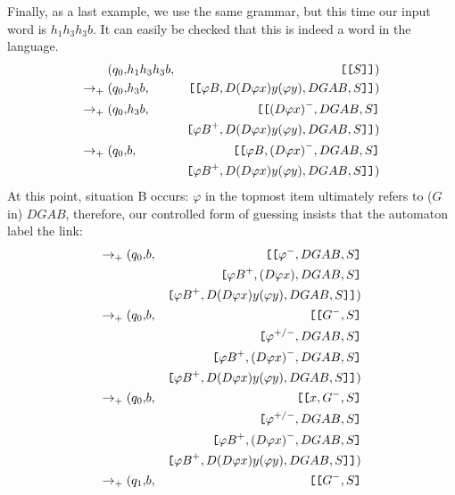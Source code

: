 \begin{example}
Finally, as a last example, we use the same grammar, but this time our
input word is $h_1h_3h_3b$. It can easily be checked that this is
indeed a word in the language.
\begin{eqnarray}
\nonumber (q_0, & h_1h_3h_3b, & \hbox{\tt [}{\hbox{\tt [}{S}\hbox{\tt ]}}\hbox{\tt ]})\\
\nonumber \rightarrow_+ (q_0, & h_3b, & \hbox{\tt [}{\hbox{\tt [}{\varphi B, D(D \varphi x) y (\varphi y), DGAB,S}\hbox{\tt ]}}\hbox{\tt ]})\\
\nonumber \rightarrow_+ (q_0, & h_3b, &  \hbox{\tt [}\hbox{\tt [}{ {(D \varphi x)}^{-}, DGAB,S}\hbox{\tt ]}\\
\nonumber & & \hbox{\tt [}{{\varphi B}^{+}, D(D \varphi x) y (\varphi
y), DGAB,S}\hbox{\tt ]}\hbox{\tt ]})\\
\nonumber \rightarrow_+ (q_0, & b, &  \hbox{\tt [}\hbox{\tt [}{ \varphi B,{(D \varphi x)}^{-}, DGAB,S}\hbox{\tt ]}\\
\nonumber & & \hbox{\tt [}{{\varphi B}^{+}, D(D \varphi x) y (\varphi
y), DGAB,S}\hbox{\tt ]} \hbox{\tt ]})
\end{eqnarray}
At this point, situation B occurs: $\varphi$ in the topmost item
ultimately refers to ($G$ in) $DGAB$, therefore, our controlled form of
guessing insists that the automaton label the link:
\begin{eqnarray}
\nonumber \rightarrow_+ (q_0, &b, &  \hbox{\tt [}\mkstore{ \varphi^{-}, DGAB,S}\\
\nonumber & & \mkstore{{\varphi B}^{+}, {(D \varphi x)}, DGAB,S}\\
\nonumber & & \mkstore{{\varphi B}^{+}, D(D \varphi x) y (\varphi
y), DGAB,S}
\hbox{\tt ]})\\
\nonumber \rightarrow_+ (q_0, &b, &  \hbox{\tt[}\mkstore{ G^{-},S}\\
\nonumber & & \mkstore{ \varphi^{+/-}, DGAB,S}\\
\nonumber & & \mkstore{{\varphi B}^{+},{(D \varphi x)}^{-}, DGAB,S}\\
\nonumber & & \mkstore{{\varphi B}^{+}, D(D \varphi x) y (\varphi y), DGAB,S} \hbox{\tt ]})\\
\nonumber \rightarrow_+ (q_0, &b, &  \hbox{\tt[}\mkstore{x,G^{-},S}\\
\nonumber & & \mkstore{ \varphi^{+/-}, DGAB,S}\\
\nonumber & & \mkstore{{\varphi B}^{+},{(D \varphi x)}^{-}, DGAB,S}\\
\nonumber & & \mkstore{{\varphi B}^{+}, D(D \varphi x) y (\varphi
y), DGAB,S}
\hbox{\tt ]})\\
\nonumber \rightarrow_+ (q_1, &b, &  \hbox{\tt[}\mkstore{G^{-},S}\\

\end{eqnarray}
\end{example}
